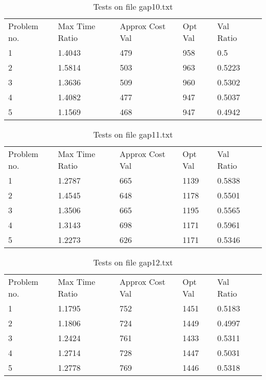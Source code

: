     \begin{table}[]
    \caption{Tests on file gap10.txt}
    \centering
    \begin{tabular}{llllll}
    Problem no. & Max Time Ratio & Approx Cost Val  & Opt Val & Val Ratio \\ 1 & 1.4043 & 479 & 958 & 0.5\\ \hline
2 & 1.5814 & 503 & 963 & 0.5223\\ \hline
3 & 1.3636 & 509 & 960 & 0.5302\\ \hline
4 & 1.4082 & 477 & 947 & 0.5037\\ \hline
5 & 1.1569 & 468 & 947 & 0.4942\\ \hline
\end{tabular}
    \end{table}
    

    \begin{table}[]
    \caption{Tests on file gap11.txt}
    \centering
    \begin{tabular}{llllll}
    Problem no. & Max Time Ratio & Approx Cost Val  & Opt Val & Val Ratio \\ 1 & 1.2787 & 665 & 1139 & 0.5838\\ \hline
2 & 1.4545 & 648 & 1178 & 0.5501\\ \hline
3 & 1.3506 & 665 & 1195 & 0.5565\\ \hline
4 & 1.3143 & 698 & 1171 & 0.5961\\ \hline
5 & 1.2273 & 626 & 1171 & 0.5346\\ \hline
\end{tabular}
    \end{table}
    

    \begin{table}[]
    \caption{Tests on file gap12.txt}
    \centering
    \begin{tabular}{llllll}
    Problem no. & Max Time Ratio & Approx Cost Val  & Opt Val & Val Ratio \\ 1 & 1.1795 & 752 & 1451 & 0.5183\\ \hline
2 & 1.1806 & 724 & 1449 & 0.4997\\ \hline
3 & 1.2424 & 761 & 1433 & 0.5311\\ \hline
4 & 1.2714 & 728 & 1447 & 0.5031\\ \hline
5 & 1.2778 & 769 & 1446 & 0.5318\\ \hline
\end{tabular}
    \end{table}
    

